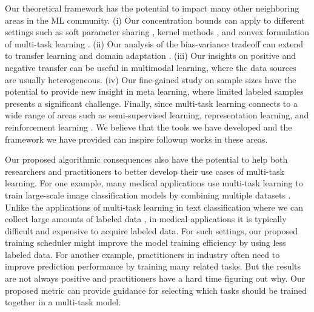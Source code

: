 Our theoretical framework has the potential to impact many other neighboring areas in the ML community.
(i) Our concentration bounds can apply to different settings such as soft parameter sharing \cite{R17} , kernel methods \cite{EMP05}, and convex formulation of multi-task learning \cite{ZY14}.
(ii) Our analysis of the bias-variance tradeoff can extend to transfer learning and domain adaptation \cite{K18}.
(iii) Our insights on positive and negative transfer can be useful in multimodal learning, where the data sources are usually heterogeneous.
(iv) Our fine-gained study on sample sizes have the potential to provide new insight in meta learning, where limited labeled samples presents a significant challenge.
Finally, since multi-task learning connects to a wide range of areas \cite{V20} such as semi-supervised learning, representation learning, and reinforcement learning \cite{YKGLHF20}.%
We believe that the tools we have developed and the framework we have provided can inspire followup works in these areas.

Our proposed algorithmic consequences also have the potential to help both researchers and practitioners to better develop their use cases of multi-task learning.
For one example, many medical applications use multi-task learning to train large-scale image classification models by combining multiple datasets \cite{chexnet17,EA20}.
Unlike the applications of multi-task learning in text classification where we can collect large amounts of labeled data \cite{GLUE}, in medical applications it is typically difficult and expensive to acquire labeled data.
For such settings, our proposed training scheduler might improve the model training efficiency by using less labeled data.
For another example, practitioners in industry often need to improve prediction performance by training many related tasks.
But the results are not always positive and practitioners have a hard time figuring out why.
Our proposed metric can provide guidance for selecting which tasks should be trained together in a multi-task model.
\fi






